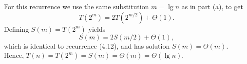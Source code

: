 For this recurrence we use the same substitution $m=\lg n$ as in part (a), to get
\[
    T(2^m) = 2T(2^{m/2})+\Theta(1).
\]
Defining $S(m)=T(2^m)$ yields
\[
    S(m) = 2S(m/2)+\Theta(1),
\]
which is identical to recurrence (4.12), and has solution $S(m)=\Theta(m)$.
Hence, $T(n)=T(2^m)=S(m)=\Theta(m)=\Theta(\lg n)$.
